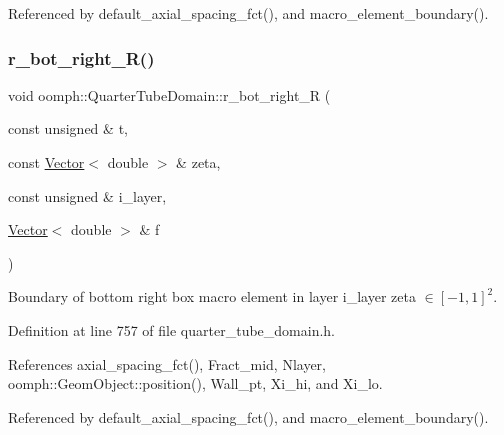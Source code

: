 Referenced by default\+\_\+axial\+\_\+spacing\+\_\+fct(), and macro\+\_\+element\+\_\+boundary().

\mbox{\label{classoomph_1_1QuarterTubeDomain_ac269033d05cfc31f78ef6c555723ba3e}} 
\subsubsection{\texorpdfstring{r\+\_\+bot\+\_\+right\+\_\+\+R()}{r\_bot\_right\_R()}}
{\footnotesize\ttfamily void oomph\+::\+Quarter\+Tube\+Domain\+::r\+\_\+bot\+\_\+right\+\_\+R (\begin{DoxyParamCaption}\item[{const unsigned \&}]{t,  }\item[{const \hyperlink{classoomph_1_1Vector}{Vector}$<$ double $>$ \&}]{zeta,  }\item[{const unsigned \&}]{i\+\_\+layer,  }\item[{\hyperlink{classoomph_1_1Vector}{Vector}$<$ double $>$ \&}]{f }\end{DoxyParamCaption})\hspace{0.3cm}{\ttfamily [private]}}



Boundary of bottom right box macro element in layer i\+\_\+layer zeta $ \in [-1,1]^2 $. 



Definition at line 757 of file quarter\+\_\+tube\+\_\+domain.\+h.



References axial\+\_\+spacing\+\_\+fct(), Fract\+\_\+mid, Nlayer, oomph\+::\+Geom\+Object\+::position(), Wall\+\_\+pt, Xi\+\_\+hi, and Xi\+\_\+lo.



Referenced by default\+\_\+axial\+\_\+spacing\+\_\+fct(), and macro\+\_\+element\+\_\+boundary().

\mbox{\label{classoomph_1_1QuarterTubeDomain_aa733400bf322afaa379bad3e21e6ade0}} 
